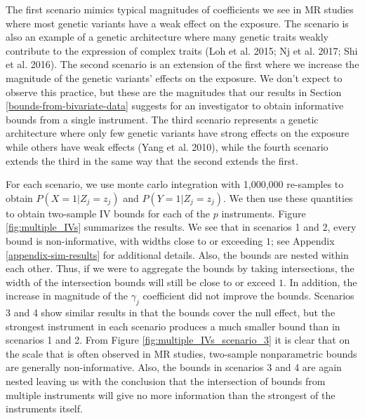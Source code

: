 \documentclass[
]{article}
\theoremstyle{plain}
\begin{document}
The first scenario mimics typical magnitudes of coefficients we see in MR studies where most genetic variants have a weak effect on the exposure. The scenario is also an example of a genetic architecture where many genetic traits weakly contribute to the expression of complex traits (Loh et al. 2015; Nj et al. 2017; Shi et al. 2016). The second scenario is an extension of the first where we increase the magnitude of the genetic variants' effects on the exposure. We don't expect to observe this practice, but these are the magnitudes that our results in Section \ref{bounds-from-bivariate-data} suggests for an investigator to obtain informative bounds from a single instrument. The third scenario represents a genetic architecture where only few genetic variants have strong effects on the exposure while others have weak effects (Yang et al. 2010), while the fourth scenario extends the third in the same way that the second extends the first.

For each scenario, we use monte carlo integration with 1,000,000 re-samples to obtain \(P(X = 1 | Z_j = z_j)\) and \(P(Y = 1 | Z_j = z_j)\). We then use these quantities to obtain two-sample IV bounds for each of the \(p\) instruments. Figure \ref{fig:multiple_IVs} summarizes the results. We see that in scenarios 1 and 2, every bound is non-informative, with widths close to or exceeding \(1\); see Appendix \ref{appendix-sim-results} for additional details. Also, the bounds are nested within each other. Thus, if we were to aggregate the bounds by taking intersections, the width of the intersection bounds will still be close to or exceed \(1\). In addition, the increase in magnitude of the \(\gamma_j\) coefficient did not improve the bounds. Scenarios 3 and 4 show similar results in that the bounds cover the null effect, but the strongest instrument in each scenario produces a much smaller bound than in scenarios 1 and 2. From Figure \ref{fig:multiple_IVs_scenario_3} it is clear that on the scale that is often observed in MR studies, two-sample nonparametric bounds are generally non-informative. Also, the bounds in scenarios 3 and 4 are again nested leaving us with the conclusion that the intersection of bounds from multiple instruments will give no more information than the strongest of the instruments itself.
\end{document}
